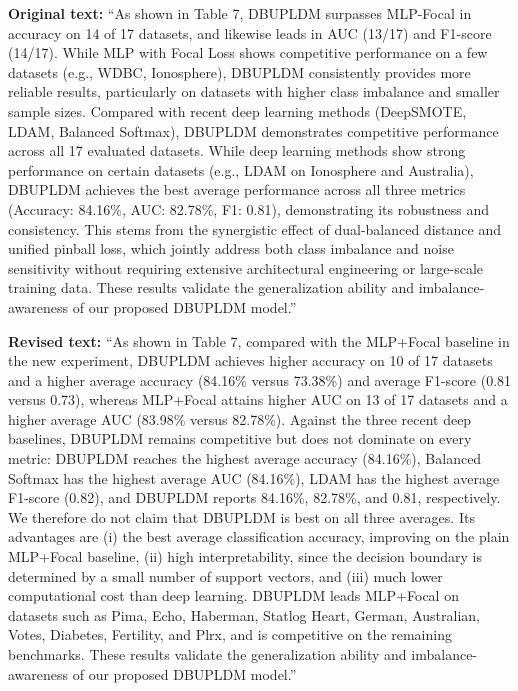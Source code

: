 \documentclass[journal,12pt, onecolumn]{IEEEtran}
\begin{document}
{\textbf{Original text:} ``As shown in Table 7, DBUPLDM surpasses MLP-Focal in accuracy on 14 of 17 datasets, and likewise leads in AUC (13/17) and F1-score (14/17). While MLP with Focal Loss shows competitive performance on a few datasets (e.g., WDBC, Ionosphere), DBUPLDM consistently provides more reliable results, particularly on datasets with higher class imbalance and smaller sample sizes. Compared with recent deep learning methods (DeepSMOTE, LDAM, Balanced Softmax), DBUPLDM demonstrates competitive performance across all 17 evaluated datasets. While deep learning methods show strong performance on certain datasets (e.g., LDAM on Ionosphere and Australia), DBUPLDM achieves the best average performance across all three metrics (Accuracy: 84.16\%, AUC: 82.78\%, F1: 0.81), demonstrating its robustness and consistency. This stems from the synergistic effect of dual-balanced distance and unified pinball loss, which jointly address both class imbalance and noise sensitivity without requiring extensive architectural engineering or large-scale training data. These results validate the generalization ability and imbalance-awareness of our proposed DBUPLDM model.''

\textbf{Revised text:} ``{\color{red}As shown in Table 7, compared with the MLP+Focal baseline in the new experiment, DBUPLDM achieves higher accuracy on 10 of 17 datasets and a higher average accuracy (84.16\% versus 73.38\%) and average F1-score (0.81 versus 0.73), whereas MLP+Focal attains higher AUC on 13 of 17 datasets and a higher average AUC (83.98\% versus 82.78\%). Against the three recent deep baselines, DBUPLDM remains competitive but does not dominate on every metric: DBUPLDM reaches the highest average accuracy (84.16\%), Balanced Softmax has the highest average AUC (84.16\%), LDAM has the highest average F1-score (0.82), and DBUPLDM reports 84.16\%, 82.78\%, and 0.81, respectively. We therefore do not claim that DBUPLDM is best on all three averages. Its advantages are (i) the best average classification accuracy, improving on the plain MLP+Focal baseline, (ii) high interpretability, since the decision boundary is determined by a small number of support vectors, and (iii) much lower computational cost than deep learning. DBUPLDM leads MLP+Focal on datasets such as Pima, Echo, Haberman, Statlog Heart, German, Australian, Votes, Diabetes, Fertility, and Plrx, and is competitive on the remaining benchmarks. These results validate the generalization ability and imbalance-awareness of our proposed DBUPLDM model.}''
}
\end{document}
